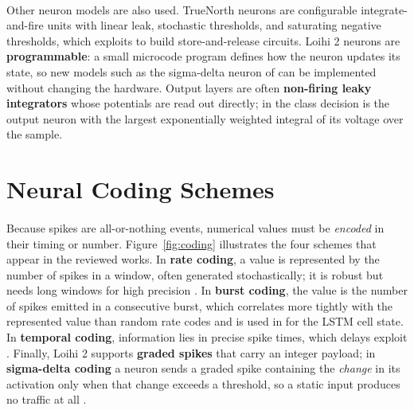\documentclass[12pt,a4paper,final]{extreport}
\begin{document}
\paragraph{} Other neuron models are also used. TrueNorth neurons are configurable integrate-and-fire units with linear leak, stochastic thresholds, and saturating negative thresholds, which \cite{p3} exploits to build store-and-release circuits. Loihi 2 neurons are \textbf{programmable}: a small microcode program defines how the neuron updates its state, so new models such as the sigma-delta neuron of \cite{p4} can be implemented without changing the hardware. Output layers are often \textbf{non-firing leaky integrators} whose potentials are read out directly; in \cite{p1} the class decision is the output neuron with the largest exponentially weighted integral of its voltage over the sample.

\section{Neural Coding Schemes}

\paragraph{} Because spikes are all-or-nothing events, numerical values must be \emph{encoded} in their timing or number. Figure~\ref{fig:coding} illustrates the four schemes that appear in the reviewed works. In \textbf{rate coding}, a value is represented by the number of spikes in a window, often generated stochastically; it is robust but needs long windows for high precision \cite{p3}. In \textbf{burst coding}, the value is the number of spikes emitted in a consecutive burst, which correlates more tightly with the represented value than random rate codes and is used in \cite{p3} for the LSTM cell state. In \textbf{temporal coding}, information lies in precise spike times, which delays exploit \cite{p1}. Finally, Loihi 2 supports \textbf{graded spikes} that carry an integer payload; in \textbf{sigma-delta coding} a neuron sends a graded spike containing the \emph{change} in its activation only when that change exceeds a threshold, so a static input produces no traffic at all \cite{oconnor2016,p4}.
\end{document}
